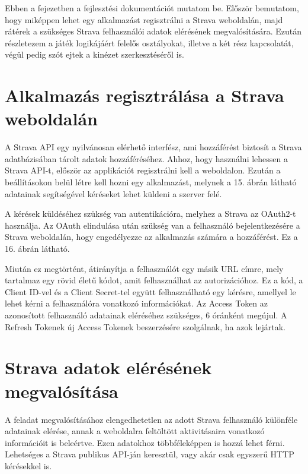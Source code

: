 Ebben a fejezetben a fejlesztési dokumentációt mutatom be. Először bemutatom, hogy miképpen lehet egy alkalmazást regisztrálni a Strava weboldalán, majd rátérek a szükséges Strava felhasználói adatok elérésének megvalósítására. Ezután részletezem a játék logikájáért felelős osztályokat, illetve a két rész kapcsolatát, végül pedig szót ejtek a kinézet szerkesztéséről is. 

\section{Alkalmazás regisztrálása a Strava weboldalán}

A Strava API egy nyilvánosan elérhető interfész, ami hozzáférést biztosít a Strava adatbázisában tárolt adatok hozzáféréséhez. Ahhoz, hogy használni lehessen a Strava API-t, először az applikációt regisztrálni kell a weboldalon. Ezután a beállításokon belül létre kell hozni egy alkalmazást, melynek a 15. ábrán látható adatainak segítségével kéréseket lehet küldeni a szerver felé. 


A kérések küldéséhez szükség van autentikációra, melyhez a Strava az OAuth2-t használja. Az OAuth elindulása után szükség van a felhasználó bejelentkezésére a Strava weboldalán, hogy engedélyezze az alkalmazás számára a hozzáférést. Ez a 16. ábrán látható. 


Miután ez megtörtént, átirányítja a felhasználót egy másik URL címre, mely tartalmaz egy rövid életű kódot, amit felhasználhat az autorizációhoz. Ez a kód, a Client ID-vel és a Client Secret-tel együtt felhasználható egy kérésre, amellyel le lehet kérni a felhasználóra vonatkozó információkat. Az Access Token az azonosított felhasználó adatainak eléréséhez szükséges, 6 óránként megújul. A Refresh Tokenek új Access Tokenek beszerzésére szolgálnak, ha azok lejártak. 

\section{Strava adatok elérésének megvalósítása}

A feladat megvalósításához elengedhetetlen az adott Strava felhasználó különféle adatainak elérése, annak a weboldalra feltöltött aktivitásaira vonatkozó információit is beleértve. Ezen adatokhoz többféleképpen is hozzá lehet férni. Lehetséges a Strava publikus API-ján keresztül, vagy akár csak egyszerű HTTP kérésekkel is. 

